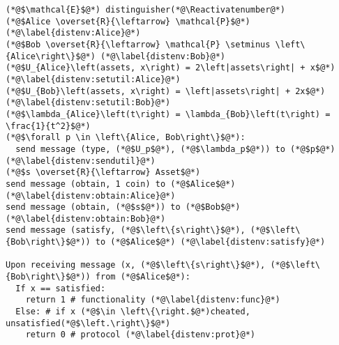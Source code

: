 \Suppressnumber
\begin{lstlisting}[label=distenv, style=numbers]
(*@$\mathcal{E}$@*) distinguisher(*@\Reactivatenumber@*)
(*@$Alice \overset{R}{\leftarrow} \mathcal{P}$@*) (*@\label{distenv:Alice}@*)
(*@$Bob \overset{R}{\leftarrow} \mathcal{P} \setminus \left\{Alice\right\}$@*) (*@\label{distenv:Bob}@*)
(*@$U_{Alice}\left(assets, x\right) = 2\left|assets\right| + x$@*) (*@\label{distenv:setutil:Alice}@*)
(*@$U_{Bob}\left(assets, x\right) = \left|assets\right| + 2x$@*) (*@\label{distenv:setutil:Bob}@*)
(*@$\lambda_{Alice}\left(t\right) = \lambda_{Bob}\left(t\right) = \frac{1}{t^2}$@*)
(*@$\forall p \in \left\{Alice, Bob\right\}$@*):
  send message (type, (*@$U_p$@*), (*@$\lambda_p$@*)) to (*@$p$@*) (*@\label{distenv:sendutil}@*)
(*@$s \overset{R}{\leftarrow} Asset$@*)
send message (obtain, 1 coin) to (*@$Alice$@*) (*@\label{distenv:obtain:Alice}@*)
send message (obtain, (*@$s$@*)) to (*@$Bob$@*) (*@\label{distenv:obtain:Bob}@*)
send message (satisfy, (*@$\left\{s\right\}$@*), (*@$\left\{Bob\right\}$@*)) to (*@$Alice$@*) (*@\label{distenv:satisfy}@*)

Upon receiving message (x, (*@$\left\{s\right\}$@*), (*@$\left\{Bob\right\}$@*)) from (*@$Alice$@*):
  If x == satisfied:
    return 1 # functionality (*@\label{distenv:func}@*)
  Else: # if x (*@$\in \left\{\right.$@*)cheated, unsatisfied(*@$\left.\right\}$@*)
    return 0 # protocol (*@\label{distenv:prot}@*)
\end{lstlisting}

